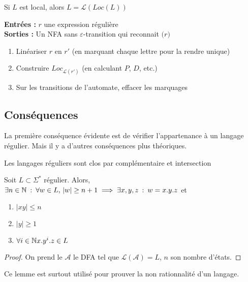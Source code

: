 \begin{theorem}
	Si $L$ est local, alors $L = \mathcal L(Loc(L))$
\end{theorem}

\begin{algo}
	\textbf{Entrées :} $r$ une expression régulière\\
	\textbf{Sorties :} Un NFA sans $\varepsilon$-transition qui reconnait $\mathcal (r)$
	\begin{enumerate}
		\item Linéariser $r$ en $r'$ (en marquant chaque lettre pour la rendre unique)
		\item Construire $Loc_{\mathcal L(r')}$ (en calculant $P$, $D$, etc.)
		\item Sur les transitions de l'automate, effacer les marquages
	\end{enumerate}
\end{algo}

\subsection{Conséquences}

La première conséquence évidente est de vérifier l'appartenance à un langage régulier. Mais il y a d'autres conséquences plus théoriques.

\begin{theorem}
	Les langages réguliers sont clos par complémentaire et intersection
\end{theorem}

\begin{theorem}
	Soit $L \subset \Sigma^*$ régulier. Alors, $\exists n \in \mathbb{N} \: : \: \forall w \in L, \, |w| \geq n+1 \implies \exists x, y, z \: : \: w = x.y.z $ et \begin{enumerate}
		\item $|xy| \leq n$
		\item $|y|\geq 1$
		\item $\forall i \in \mathbb{N} x.y^i.z \in L$
	\end{enumerate} 
\end{theorem}

\begin{proof}
	On prend le $\mathcal A$ le DFA tel que $\mathcal L(\mathcal A) = L$, $n$ son nombre d'états.
\end{proof}

\begin{rem}
	Ce lemme est surtout utilisé pour prouver la non rationnalité d'un langage.
\end{rem}

